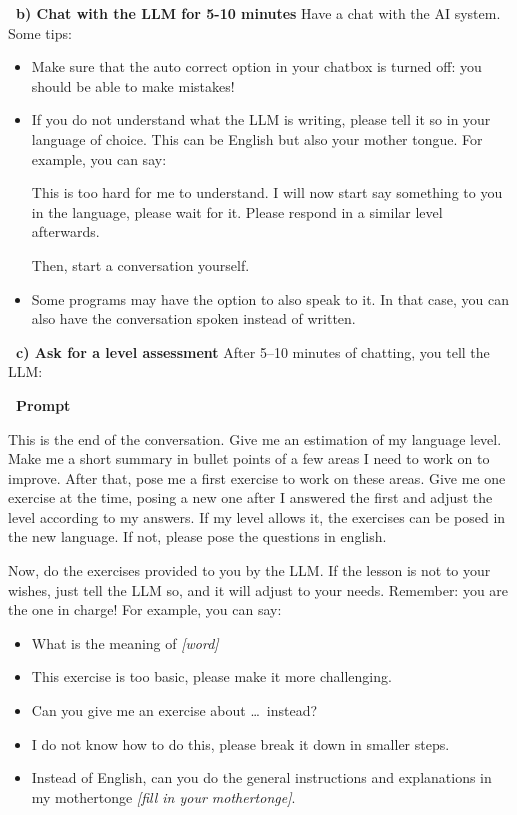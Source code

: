 \documentclass[12pt]{article}
\newcounter{exercise}
\newcommand{\exercisetitle}[1]{%
\stepcounter{exercise}
  \vspace{0.5cm}
  \colorbox{maincolor}{%
    \makebox[\dimexpr\linewidth-2\fboxsep][l]{%
      \textcolor{white}{\faPen\ Assignment \theexercise:~ #1}%
    }%
  }
  \vspace{0.3cm}
}
\newcounter{question}
\begin{document}
\vspace{0.3cm}
\textcolor{maincolor}{\textbf{\faPen\ b) Chat with the LLM for 5-10 minutes}} 
Have a chat with the AI system. Some tips: 

\begin{itemize}
    \item Make sure that the auto correct option in your chatbox is turned off: you should be able to make mistakes! 
    \item If you do not understand what the LLM is writing, please tell it so in your language of choice. This can be English but also your mother tongue. For example, you can say: 
    \begin{promptbox}
This is too hard for me to understand. I will now start say something to you in the language, please wait for it. Please respond in a similar level afterwards.
\end{promptbox}
Then, start a conversation yourself. 
    \item Some programs may have the option to also speak to it. In that case, you can also have the conversation spoken instead of written.
\end{itemize}


\vspace{0.3cm}
\textcolor{maincolor}{\textbf{\faPen\ c) Ask for a level assessment}} 
After 5--10 minutes of chatting, you tell the LLM:

\vspace{0.3cm}
\textcolor{maincolor}{\textbf{\faCopy\ Prompt}}
\begin{promptbox}
This is the end of the conversation. Give me an estimation of my language level. Make me a short summary in bullet points of a few areas I need to work on to improve.
After that, pose me a first exercise to work on these areas. Give me one exercise at the time, posing a new one after I answered the first and adjust the level according to my answers.
If my level allows it, the exercises can be posed in the new language. If not, please pose the questions in english.
\end{promptbox}


\exercisetitle{Personalized lesson}

Now, do the exercises provided to you by the LLM.
If the lesson is not to your wishes, just tell the LLM so, and it will adjust to your needs. Remember: you are the one in charge! For example, you can say:

\begin{itemize}
    \item What is the meaning of \textit{[word]}
    \item This exercise is too basic, please make it more challenging.
    \item Can you give me an exercise about \ldots\ instead?
    \item I do not know how to do this, please break it down in smaller steps.
    \item Instead of English, can you do the general instructions and explanations in my mothertonge \textit{[fill in your mothertonge]}.
\end{itemize}
\end{document}
